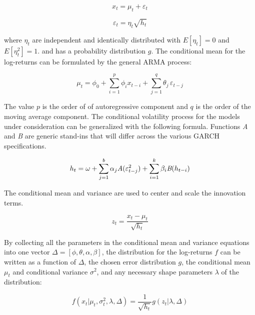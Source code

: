 \documentclass[12pt]{article}
\begin{document}
\begin{equation} \label{eqn:marginalModel}
    x_{t} = \mu_{t} + \varepsilon_{t}
\end{equation}

\begin{equation}
	\varepsilon_{t} = \eta_{t} \sqrt{h_{t}}
\end{equation}

where $\eta_{t}$ are independent and identically distributed with $E[\eta_{t}] = 0$ and $E[\eta^{2}_{t}] = 1$. and has a probability distribution $g$. The conditional mean for the log-returns can be formulated by the general ARMA process:

\begin{equation} \label{eq:conditional_mean}
    \mu_{t} = \phi_{0} + \sum_{i=1}^{p} \phi_{i} x_{t-i} + \sum_{j=1}^{q} \theta_{j} \, \varepsilon_{t - j}
\end{equation}

 The value $p$ is the order of of autoregressive component and $q$ is the order of the moving average component. The conditional volatility process for the models under consideration can be generalized with the following formula. Functions \emph{A} and \emph{B} are generic stand-ins that will differ across the various GARCH specifications.

\begin{equation} \label{eq:conditional_var}
    h_{t} = \omega + \sum_{j=1}^{b} \alpha_{j} \emph{A}(\varepsilon^{2}_{t - j}) + \sum_{i=1}^{k} \beta_{i} \emph{B}(h_{t - i})
\end{equation}

The conditional mean and variance are used to center and scale the innovation terms.

\begin{equation} \label{eq:z_score_returns}
    z_{t} = \frac{x_{t} - \mu_{t}}{\sqrt{h_{t}}}
\end{equation}

By collecting all the parameters in the conditional mean and variance equations into one vector $\Delta = [\phi, \theta, \alpha, \beta]$, the distribution for the log-returns $f$ can be written as a function of $\Delta$, the chosen error distribution $g$, the conditional mean $\mu_{t}$ and conditional variance $\sigma^{2}$, and any necessary shape parameters $\lambda$ of the distribution:

\begin{equation} \label{eq:conditional_distr}
    f(x_{t} | \mu_{t}, \sigma^{2}_{t}, \lambda, \Delta) = \frac{1}{\sqrt{h_{t}}} g(z_{t} | \lambda, \Delta)
\end{equation}
\end{document}
